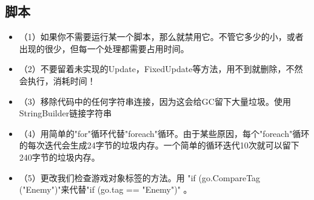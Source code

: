 \documentclass[9pt, b5paper]{article}
\begin{document}
\subsection{脚本}
\label{sec:orgee5b234}
\begin{itemize}
\item （1）如果你不需要运行某一个脚本，那么就禁用它。不管它多少的小，或者出现的很少，但每一个处理都需要占用时间。
\item （2）不要留着未实现的Update，FixedUpdate等方法，用不到就删除，不然会执行，消耗时间！
\item （3）移除代码中的任何字符串连接，因为这会给GC留下大量垃圾。使用StringBuilder链接字符串
\item （4）用简单的"for"循环代替"foreach"循环。由于某些原因，每个"foreach"循环的每次迭代会生成24字节的垃圾内存。一个简单的循环迭代10次就可以留下240字节的垃圾内存。
\item （5）更改我们检查游戏对象标签的方法。用 "if (go.CompareTag ("Enemy")"来代替"if (go.tag == "Enemy")" 。


\end{itemize}
\end{document}
